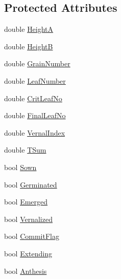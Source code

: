 \subsection*{Protected Attributes}
\begin{DoxyCompactItemize}
\item 
double \hyperlink{classcrop_rye_a56f613f23017934a4876c34bfb065e44}{HeightA}
\item 
double \hyperlink{classcrop_rye_a8fee56d92137c695ffbce9820d38eb9c}{HeightB}
\item 
double \hyperlink{classcrop_rye_a015253907d3cba599baf628f76a5bc89}{GrainNumber}
\item 
double \hyperlink{classcrop_rye_a4907c9d07c45b91e95bbfeea1838bcc3}{LeafNumber}
\item 
double \hyperlink{classcrop_rye_a3c7fdd1d8fa45ed6ba4ff5f62f31e2c9}{CritLeafNo}
\item 
double \hyperlink{classcrop_rye_a886db0739f0804924fc51569d26e5b7b}{FinalLeafNo}
\item 
double \hyperlink{classcrop_rye_a955145aa7baf3c94b732e46fcee08de0}{VernalIndex}
\item 
double \hyperlink{classcrop_rye_a2de0cde8d4ef4ff9721e57aa6fa016ae}{TSum}
\item 
bool \hyperlink{classcrop_rye_a3d5c385e415eb60ca33b00bafe5b3ce0}{Sown}
\item 
bool \hyperlink{classcrop_rye_a29d6500b13821a2b531611128a4f169e}{Germinated}
\item 
bool \hyperlink{classcrop_rye_af90c57ab4b93d1582316d3a56d3322fe}{Emerged}
\item 
bool \hyperlink{classcrop_rye_adf7f306b8c8ba27f5b9b10ba9648997e}{Vernalized}
\item 
bool \hyperlink{classcrop_rye_a875706750260242842d47798984fd748}{CommitFlag}
\item 
bool \hyperlink{classcrop_rye_a17362b421105a32ee37a63770e0a604b}{Extending}
\item 
bool \hyperlink{classcrop_rye_adb2fff10b6b8b877dd631ac43dd9d9f5}{Anthesis}
\end{DoxyCompactItemize}


